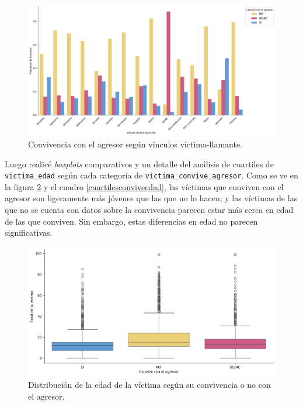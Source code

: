 \documentclass[10 pt]{article}
\begin{document}
\begin{figure}[H]
\begin{center}
\includegraphics[scale=.4]{images/latex_llamante_vin_convive.png}
\caption{Convivencia con el agresor según vínculos víctima-llamante.}
\label{llamvincconvive}
\end{center}
\end{figure} 


Luego realicé \textit{boxplots} comparativos y un detalle del análisis de cuartiles de \texttt{victima\_edad} según cada categoría de \texttt{victima\_convive\_agresor}. Como se ve en la figura \ref{boxplotsconvivenciaedad} y el cuadro \ref{cuartilesconviveedad}, las víctimas que conviven con el agresor son ligeramente más jóvenes que las que no lo hacen; y las víctimas de las que no se cuenta con datos sobre la convivencia parecen estar más cerca en edad de las que conviven. Sin embargo, estas diferencias en edad no parecen significativas.

\begin{figure}[H]
    \begin{center}
    \includegraphics[scale=.4]{images/latex_boxplot_convive_edad.png}
    \caption{Distribución de la edad de la víctima según su convivencia o no con el agresor.}
    \label{boxplotsconvivenciaedad}
    \end{center}
    \end{figure}
\end{document}
